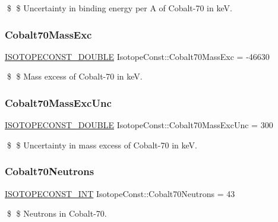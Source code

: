\$ \$ Uncertainty in binding energy per A of Cobalt-\/70 in keV. \mbox{\label{group___isotope_const-_cobalt-_co70_ga192cf1ce171ac509269a8fafa6cb5ee0}} 
\subsubsection{\texorpdfstring{Cobalt70\+Mass\+Exc}{Cobalt70MassExc}}
{\footnotesize\ttfamily \mbox{\hyperlink{group___isotope_const-_macros_ga8f45a7272ce02c0b4c65c44636ed719a}{I\+S\+O\+T\+O\+P\+E\+C\+O\+N\+S\+T\+\_\+\+D\+O\+U\+B\+LE}} Isotope\+Const\+::\+Cobalt70\+Mass\+Exc = -\/46630}

\$ \$ Mass excess of Cobalt-\/70 in keV. \mbox{\label{group___isotope_const-_cobalt-_co70_gad8f9d79c064b839090bbfbad0b45cedc}} 
\subsubsection{\texorpdfstring{Cobalt70\+Mass\+Exc\+Unc}{Cobalt70MassExcUnc}}
{\footnotesize\ttfamily \mbox{\hyperlink{group___isotope_const-_macros_ga8f45a7272ce02c0b4c65c44636ed719a}{I\+S\+O\+T\+O\+P\+E\+C\+O\+N\+S\+T\+\_\+\+D\+O\+U\+B\+LE}} Isotope\+Const\+::\+Cobalt70\+Mass\+Exc\+Unc = 300}

\$ \$ Uncertainty in mass excess of Cobalt-\/70 in keV. \mbox{\label{group___isotope_const-_cobalt-_co70_ga20ea6696830ecbe1519386131e1f728b}} 
\subsubsection{\texorpdfstring{Cobalt70\+Neutrons}{Cobalt70Neutrons}}
{\footnotesize\ttfamily \mbox{\hyperlink{group___isotope_const-_macros_ga5f18360b3e99483a35c32d789e62621c}{I\+S\+O\+T\+O\+P\+E\+C\+O\+N\+S\+T\+\_\+\+I\+NT}} Isotope\+Const\+::\+Cobalt70\+Neutrons = 43}

\$ \$ Neutrons in Cobalt-\/70. \mbox{\label{group___isotope_const-_cobalt-_co70_gabb27099ce0be4a93b9ef7e8d67956e6c}} 

